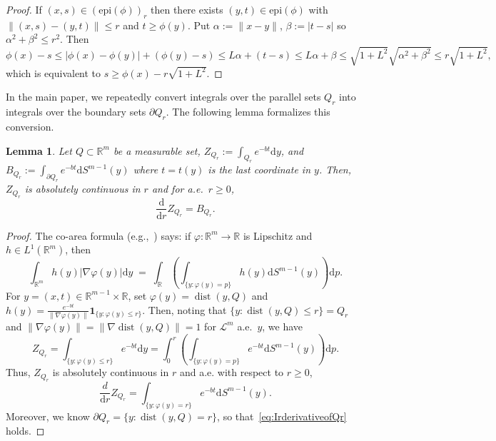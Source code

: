 \documentclass[11pt,letterpaper]{article}
\newcommand{\R}{\mathbb{R}}
\newcommand{\dist}{\operatorname{dist}}
\newcommand{\D}{\mathrm{d}}
\newtheorem{lemma}[thm]{Lemma}
\begin{document}
\begin{proof}
If $(x,s)\in(\mathrm{epi}(\phi))_r$ then there exists $(y,t)\in\mathrm{epi}(\phi)$ with
$\|(x,s)-(y,t)\|\le r$ and $t\ge \phi(y)$. Put $\alpha:=\|x-y\|$, $\beta:=|t-s|$ so $\alpha^2+\beta^2\le r^2$.
Then
\[
\phi(x)-s \le |\phi(x)-\phi(y)| + (\phi(y)-s) \le L\alpha + (t-s) \le L\alpha + \beta
\le \sqrt{1+L^2} \sqrt{\alpha^2+\beta^2}\le r\sqrt{1+L^2},
\]
which is equivalent to $s\ge \phi(x)-r\sqrt{1+L^2}$.
\end{proof}

In the main paper, we repeatedly convert integrals over the parallel sets $Q_r$ into integrals over the boundary sets $\partial Q_r$. The following lemma formalizes this conversion. 

\begin{lemma}
\label{lem:coarea}    
Let $Q\subset\R^{m}$ be a measurable set, $Z_{Q_r}:=\int_{Q_r} e^{-bt} \D y$, and 
$B_{Q_r}:=\int_{\partial Q_r} e^{-bt} \D S^{m-1}(y)$ where $t=t(y)$ is the last coordinate in $y$. 
Then, $Z_{Q_r}$ is absolutely continuous in $r$ and for a.e.\ $r\ge 0$,
\begin{equation}\label{eq:IrderivativeofQr}
\frac{\D}{\D r}Z_{Q_r}=B_{Q_r}.
\end{equation}
\end{lemma}

\begin{proof}
The co-area formula (e.g.,\ \cite[Thm.~3.2.12]{federer2014geometric}) says: if $\varphi:\R^{m}\to\R$ is Lipschitz and
$h\in L^{1}(\R^{m})$, then
\[
\int_{\R^{m}} h(y) |\nabla\varphi(y)| \D y
\;=\;
\int_{\R}\left(\int_{\{y:\varphi(y)= p\}} h(y) \D S^{m-1}(y)\right)\D p.
\]
For $y=(x,t)\in\R^{m-1}\times\R$, set $\varphi(y)=\dist (y,Q)$ and
$h(y)=\frac{e^{-bt}}{\|\nabla\varphi(y)\|}\mathbf 1_{\{y:\varphi(y)\le r\}}$.
Then, noting that $\{y:\dist (y,Q)\le r\}=Q_r$ and $\|\nabla \varphi(y)\| = \|\nabla \dist (y,Q)\|=1$ for $\mathcal{L}^{m}$ a.e.\ $y$, we have
\begin{equation}\label{eq:coarea-split}
Z_{Q_r} = \int_{\{y:\varphi(y)\le r\}} e^{-bt} \D y
=\int_{0}^{r}\left(\int_{\{y:\varphi(y)= p\}}
{e^{-bt}} \D S^{m-1}(y)\right)\D p.
\end{equation}
Thus, $Z_{Q_r}$ is absolutely continuous in $r$ and a.e. with respect to $r\geq 0$, 
\[
\frac{d}{\D r}Z_{Q_r}=\int_{\{y:\varphi(y)= r\}}
{e^{-bt}} \D S^{m-1}(y). 
\]
Moreover, we know $\partial Q_r=\{y:\dist (y,Q)= r\}$, so that~\eqref{eq:IrderivativeofQr} holds. 
\end{proof}
\end{document}

